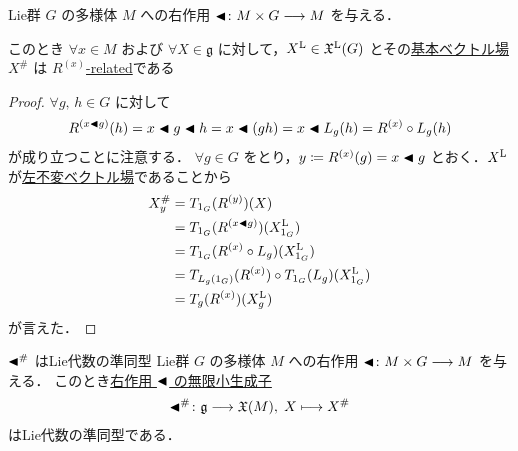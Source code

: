 \documentclass[geometry_main]{subfiles}
\begin{document}
\begin{mylem}[label=lem:fundamental-vecf]{}
    Lie群 $G$ の\cinfty 多様体 $M$ への右作用 $\blacktriangleleft \colon M \times G \longrightarrow M$ を与える．
    
    このとき $\forall x \in M$ および $\forall X \in \mathfrak{g}$ に対して，$X^{\mathrm{L}} \in \mathfrak{X}^{\mathrm{L}}(G)$ とその\hyperref[def:fundamental-vecf]{基本ベクトル場} $X^\#$ は $R^{(x)}$\hyperref[def:F-related]{-related}である
\end{mylem}

\begin{proof}
    $\forall g,\, h \in G$ に対して
    \begin{align}
        R^{(x \blacktriangleleft g)}(h) = x \blacktriangleleft g \blacktriangleleft h = x \blacktriangleleft(gh) = x \blacktriangleleft L_g(h) = R^{(x)} \circ L_g(h)
    \end{align}
    が成り立つことに注意する．
    $\forall g \in G$ をとり，$y \coloneqq R^{(x)}(g) = x \blacktriangleleft g$ とおく．$X^{\mathrm{L}}$ が\hyperref[def:left-invariant]{左不変ベクトル場}であることから
    \begin{align}
        X^\#_y &= T_{1_G}(R^{(y)})(X) \\
        &= T_{1_G} (R^{(x \blacktriangleleft g)}) (X^{\mathrm{L}}_{1_G}) \\
        &= T_{1_G} (R^{(x)} \circ L_g)(X^{\mathrm{L}}_{1_G}) \\
        &= T_{L_g(1_G)} (R^{(x)}) \circ T_{1_G}(L_g)(X^{\mathrm{L}}_{1_G}) \\
        &= T_{g} (R^{(x)}) (X^{\mathrm{L}}_g)
    \end{align}
    が言えた．
\end{proof}


\begin{myprop}[label=prop:infinitesimal-generator-R]{$\blacktriangleleft^\#$ はLie代数の準同型}
    Lie群 $G$ の\cinfty 多様体 $M$ への右作用 $\blacktriangleleft \colon M \times G \longrightarrow M$ を与える．
    このとき\hyperref[def:fundamental-vecf]{右作用 $\blacktriangleleft$ の無限小生成子}
    \begin{align}
        \blacktriangleleft^\# \colon \mathfrak{g} \longrightarrow \mathfrak{X}(M),\; X \longmapsto X^\#
    \end{align}
    はLie代数の準同型である．
\end{myprop}
\end{document}
